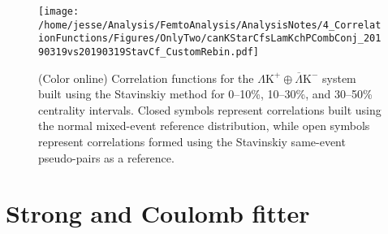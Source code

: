 \documentclass[ALICE,manyauthors]{cernphprep}
\newcommand{\LamKchP}{$\Lambda\mathrm{K^{+}}$\xspace}
\providecommand{\DIFaddbeginFL}{} %
\providecommand{\DIFaddendFL}{} %
\providecommand{\DIFdelbeginFL}{} %
\providecommand{\DIFdelendFL}{} %
\begin{document}
\begin{figure}[h!]
  \centering
  \DIFdelbeginFL %
\DIFdelendFL \DIFaddbeginFL \texttt{[image: /home/jesse/Analysis/FemtoAnalysis/AnalysisNotes/4\_CorrelationFunctions/Figures/OnlyTwo/canKStarCfsLamKchPCombConj\_20190319vs20190319StavCf\_CustomRebin.pdf]}
  \DIFaddendFL \caption[\LamKchP Stavinskiy Correlation Functions]
  {
  (Color online) Correlation functions for the $\Lambda\mathrm{K^{+}}\oplus\overline{\Lambda}\mathrm{K^{-}}$ system built using the Stavinskiy method for 0--10\%, 10--30\%, and 30--50\% centrality intervals.  Closed symbols represent correlations built using the normal mixed-event reference distribution, while open symbols represent correlations formed using the Stavinskiy same-event pseudo-pairs as a reference.
  }
  \label{fig:StavCfs_Correct_LamKchP}
\end{figure} 



\section{Strong and Coulomb fitter}
\label{App:CoulombFitter}
\end{document}
